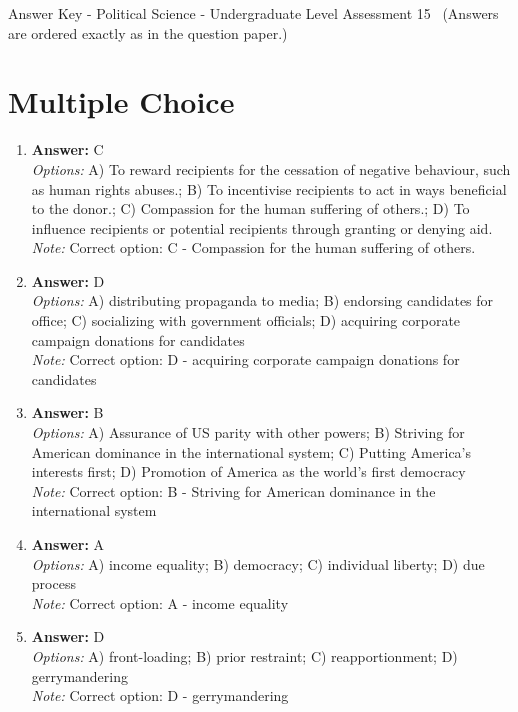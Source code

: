 \documentclass[12pt]{article}
\begin{document}
\begin{center}
Answer Key - Political Science - Undergraduate Level Assessment 15 \
\small (Answers are ordered exactly as in the question paper.)
\end{center}

\section*{Multiple Choice}
\begin{enumerate}[label=\arabic*.]
\item \textbf{Answer:} C
\\ \textit{Options:} A) To reward recipients for the cessation of negative behaviour, such as human rights abuses.; B) To incentivise recipients to act in ways beneficial to the donor.; C) Compassion for the human suffering of others.; D) To influence recipients or potential recipients through granting or denying aid.
\\ \textit{Note:} Correct option: C - Compassion for the human suffering of others.
\item \textbf{Answer:} D
\\ \textit{Options:} A) distributing propaganda to media; B) endorsing candidates for office; C) socializing with government officials; D) acquiring corporate campaign donations for candidates
\\ \textit{Note:} Correct option: D - acquiring corporate campaign donations for candidates
\item \textbf{Answer:} B
\\ \textit{Options:} A) Assurance of US parity with other powers; B) Striving for American dominance in the international system; C) Putting America's interests first; D) Promotion of America as the world's first democracy
\\ \textit{Note:} Correct option: B - Striving for American dominance in the international system
\item \textbf{Answer:} A
\\ \textit{Options:} A) income equality; B) democracy; C) individual liberty; D) due process
\\ \textit{Note:} Correct option: A - income equality
\item \textbf{Answer:} D
\\ \textit{Options:} A) front-loading; B) prior restraint; C) reapportionment; D) gerrymandering
\\ \textit{Note:} Correct option: D - gerrymandering
\end{enumerate}
\end{document}
